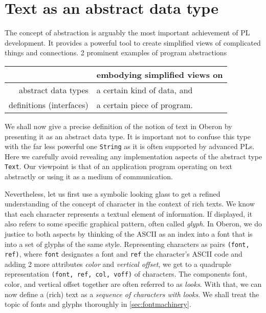 \section{Text as an abstract data type}
\label{sec:textyp}
The concept of abstraction is arguably the most important achievement of PL development.
It provides a powerful tool to create simplified views of complicated things and connections.
2 prominent examples of program abstractions
\begin{table}[h!]
  \centering
  \begin{tabular}{r l}
                                     & \small{embodying simplified views on} \\\hline
    \small{abstract data types}      & \small{a certain kind of data, and} \\
    \small{definitions (interfaces)} & \small{a certain piece of program.}
  \end{tabular}
\end{table}

We shall now give a precise definition of the notion of text in Oberon
by presenting it as an abstract data type.
It is important not to confuse this type with the far less powerful one \verb|String|
as it is often supported by advanced PLs.
Here we carefully avoid revealing any implementation aspects of the abstract type \verb|Text|.
Our viewpoint is that of an application program operating on text abstractly
or using it as a medium of communication.

Nevertheless, let us first use a symbolic looking glass to get a refined understanding
of the concept of character in the context of rich texts.
We know that each character represents a textual element of information.
If displayed, it also refers to some specific graphical pattern, often called \emph{glyph}.
In Oberon, we do justice to both aspects by thinking of the ASCII as an index into a font
that is into a set of glyphs of the same style.
Representing characters as pairs \verb|(font, ref)|,
where \verb|font| designates a font and \verb|ref| the character's ASCII code
and adding 2 more attributes \emph{color} and \emph{vertical offset},
we get to a quadruple representation \verb|(font, ref, col, voff)| of characters.
The components font, color, and vertical offset together are often referred to as \emph{looks}.
With that, we can now define a (rich) text as a \emph{sequence of characters with looks}.
We shall treat the topic of fonts and glyphs thoroughly in \ref{sec:fontmachinery}.

